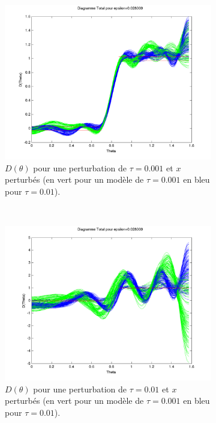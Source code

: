 \begin{figure}[h!]
\begin{subfigure}[b]{0.45\textwidth}
  \includegraphics[width=\textwidth]{D-ModRobust1-test3RobTau001.png}
  \caption{$D(\theta)$ pour une perturbation de $\tau = 0.001$ et $x$ perturbés (en vert pour un modèle de $\tau=0.001$ en bleu pour $\tau=0.01$).}
  \label{fig:D-ModRobust1-test3RobTau001}
  \end{subfigure}%
  ~ 
  \begin{subfigure}[b]{0.45\textwidth}
  \includegraphics[width=\textwidth]{D-ModRobust1-test3RobTau01.png}
  \caption{$D(\theta)$ pour une perturbation de $\tau = 0.01$ et $x$ perturbés (en vert pour un modèle de $\tau=0.001$ en bleu pour $\tau=0.01$).}
  \label{fig:D-ModRobust1-test3RobTau01}
  \end{subfigure}
  \caption{}
  \end{figure}

